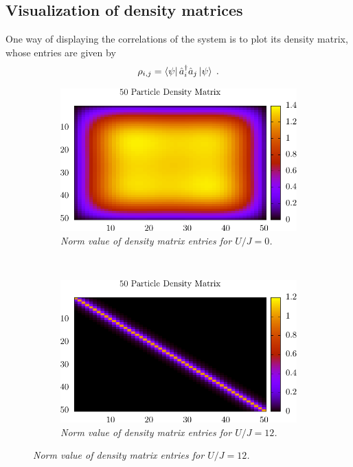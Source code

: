 \subsection{Visualization of density matrices}
One way of displaying the correlations of the system is to plot its density matrix, whose entries are given by
\begin{equation}
	\rho_{i,j} = \bra{\psi} \hat{a}_{i}^{\dag} \hat{a}_j \ket{\psi} \; .
\end{equation}
\begin{figure}[h!]
    \centering
    \begin{subfigure}[t]{0.49\textwidth}
        \includegraphics[width=\textwidth]{Figures/DensityMatSF30sweeps.pdf}
        \caption{\textit{Norm value of density matrix entries for $U/J = 0$.}}
        \label{fig:DensityMatSF}
    \end{subfigure}
    ~
    \begin{subfigure}[t]{0.49\textwidth}
        \includegraphics[width=\textwidth]{Figures/DensityMatMI.pdf}
        \caption{\textit{Norm value of density matrix entries for $U/J = 12$.}}

\end{subfigure}
\end{figure}
